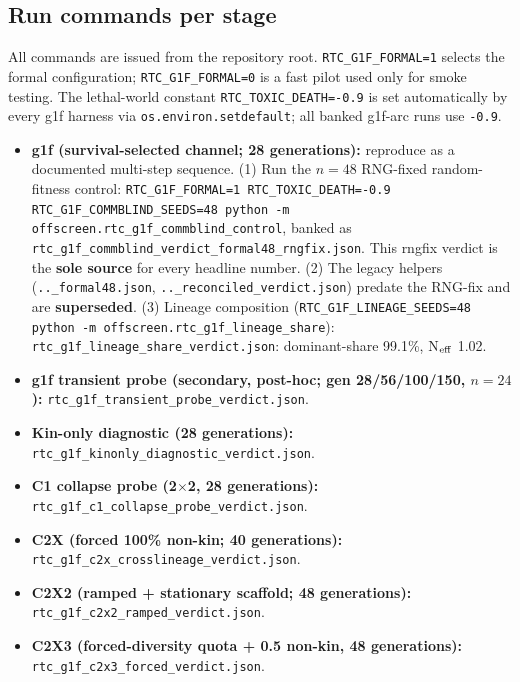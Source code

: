 \documentclass[12pt,letterpaper]{article}
\begin{document}
\subsection*{Run commands per stage}

All commands are issued from the repository root. \texttt{RTC\_G1F\_FORMAL=1} selects the
formal configuration; \texttt{RTC\_G1F\_FORMAL=0} is a fast pilot used only for smoke
testing. The lethal-world constant \texttt{RTC\_TOXIC\_DEATH=-0.9} is set automatically by
every g1f harness via \texttt{os.environ.setdefault}; all banked g1f-arc runs use
\texttt{-0.9}.

\begin{itemize}
\item \textbf{g1f (survival-selected channel; 28 generations):} reproduce as a documented
  multi-step sequence. (1) Run the $n{=}48$ RNG-fixed random-fitness control:
  \texttt{RTC\_G1F\_FORMAL=1 RTC\_TOXIC\_DEATH=-0.9 RTC\_G1F\_COMMBLIND\_SEEDS=48 python -m
  offscreen.rtc\_g1f\_commblind\_control}, banked as
  \texttt{rtc\_g1f\_commblind\_verdict\_formal48\_rngfix.json}. This rngfix verdict is the
  \textbf{sole source} for every headline number. (2) The legacy helpers
  (\texttt{..\_formal48.json}, \texttt{..\_reconciled\_verdict.json}) predate the RNG-fix and
  are \textbf{superseded}. (3) Lineage composition
  (\texttt{RTC\_G1F\_LINEAGE\_SEEDS=48 python -m offscreen.rtc\_g1f\_lineage\_share}):
  \texttt{rtc\_g1f\_lineage\_share\_verdict.json}: dominant-share 99.1\%, N$_{\rm eff}$ 1.02.

\item \textbf{g1f transient probe (secondary, post-hoc; gen 28/56/100/150, $n{=}24$):}
  \texttt{rtc\_g1f\_transient\_probe\_verdict.json}.

\item \textbf{Kin-only diagnostic (28 generations):}
  \texttt{rtc\_g1f\_kinonly\_\allowbreak diagnostic\_verdict.json}.

\item \textbf{C1 collapse probe (2$\times$2, 28 generations):}
  \texttt{rtc\_g1f\_c1\_collapse\_probe\_verdict.json}.

\item \textbf{C2X (forced 100\% non-kin; 40 generations):}
  \texttt{rtc\_g1f\_c2x\_crosslineage\_verdict.json}.

\item \textbf{C2X2 (ramped + stationary scaffold; 48 generations):}
  \texttt{rtc\_g1f\_c2x2\_ramped\_verdict.json}.

\item \textbf{C2X3 (forced-diversity quota + 0.5 non-kin, 48 generations):}
  \texttt{rtc\_g1f\_c2x3\_forced\_verdict.json}.
\end{itemize}
\end{document}
